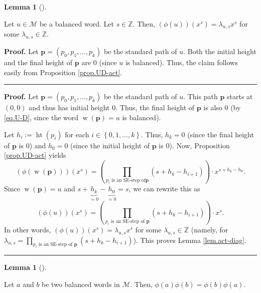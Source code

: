 \documentclass[numbers=enddot,12pt,final,onecolumn,notitlepage]{scrartcl}%
\theoremstyle{definition}
\newtheorem{lem}[theo]{Lemma}
\newenvironment{lemma}[1][]
{\begin{lem}[#1]\begin{leftbar}}
{\end{leftbar}\end{lem}}
\newenvironment{proof}[1][Proof]{\noindent\textbf{#1.} }{\ \rule{0.5em}{0.5em}}
\newcommand{\M}{\mathcal{M}}
\newcommand{\ZZ}{\mathbb{Z}}
\newcommand{\pp}{\mathbf{p}}
\newcommand{\w}{\operatorname{w}}
\newcommand{\htt}{\operatorname{ht}}
\newcommand{\tup}[1]{\left( #1 \right)}
\newenvironment{verlong}{}{}
\newenvironment{vershort}{}{}
\begin{document}
\begin{lemma}
\label{lem.act-diag}
Let $u\in\M$ be a balanced word. Let
$s\in\ZZ$. Then, $\left(  \phi\left(  u\right)  \right)  \left(
x^{s}\right)  =\lambda_{u,s}x^{s}$ for some $\lambda_{u,s}\in\ZZ$.
\end{lemma}

\begin{vershort}
\begin{proof}
Let $\pp = \tup{p_0, p_1, \ldots, p_k}$ be the standard path of $u$.
Both the initial height and the final height of $\pp$ are $0$ (since $u$ is balanced).
Thus, the claim follows easily from Proposition \ref{prop.UD-act}.
\end{proof}
\end{vershort}

\begin{verlong}
\begin{proof}
Let $\pp=\left(  p_{0},p_{1},\ldots,p_{k}\right)  $
be the standard path of $u$.
This path $\pp$ starts at $\tup{0,0}$ and thus has initial height $0$.
Thus, the final height of $\pp$ is also $0$ (by
\eqref{eq.U-D}, since the word $\w\left(  \pp\right)  =u$
is balanced).

Let $h_{i}:=\htt\left(  p_{i}\right)  $ for each $i\in\left\{
0,1,\ldots,k\right\}  $. Thus, $h_{k}=0$ (since the final height of
$\pp$ is $0$) and $h_{0}=0$ (since the initial height of $\pp$
is $0$). Now, Proposition \ref{prop.UD-act} yields%
\[
\left(  \phi\left(  \w\left(  \pp\right)  \right)
\right)  \left(  x^{s}\right)  =\left(  \prod_{p_{i}\text{ is an SE-step of
}\pp}\left(  s+h_{k}-h_{i+1}\right)  \right)  \cdot x^{s+h_{k}-h_{0}}.
\]
Since $\w\left(  \pp\right)  =u$ and
$s+\underbrace{h_{k}}_{=0}-\underbrace{h_{0}}_{=0}=s$, we can rewrite this as%
\[
\left(  \phi\left(  u\right)  \right)  \left(  x^{s}\right)  =\left(
\prod_{p_{i}\text{ is an SE-step of }\pp}\left(  s+h_{k}-h_{i+1}%
\right)  \right)  \cdot x^{s}.
\]
In other words, $\left(  \phi\left(  u\right)  \right)  \left(  x^{s}\right)
=\lambda_{u,s}x^{s}$ for some $\lambda_{u,s}\in\ZZ$ (namely, for \newline
$\lambda_{u,s}=\prod\limits_{p_{i}\text{ is an SE-step of }\pp}\left(
s+h_{k}-h_{i+1}\right)  $). This proves Lemma \ref{lem.act-diag}.
\end{proof}
\end{verlong}

\begin{lemma}
\label{lem.bal.weyl0}
Let $a$ and $b$ be two balanced words in $\M$.
Then, $\phi\tup{a} \phi\tup{b} = \phi\tup{b} \phi\tup{a}$.
\end{lemma}
\end{document}
